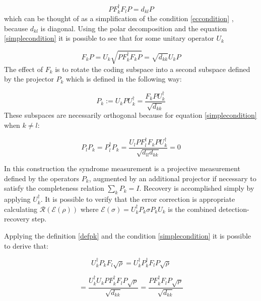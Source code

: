 \documentclass{article}
\begin{document}
\begin{equation}
	\label{simplecondition}
	P F_k^\dagger F_l P = d_{kl}P
\end{equation}
which can be thought of as a simplification of the condition \ref{eccondition} ,
because $d_{kl}$ is diagonal.
Using the polar decomposition and the equation \ref{simplecondition} it is
possible to see that for some unitary operator $U_k$

\begin{equation}
	F_k P = U_k \sqrt{PF_k^\dagger F_k P} = \sqrt{d_{kk}} U_k P
\end{equation}
The effect of $F_k$ is to rotate the coding subspace into a second subspace defined by
the projector $P_k$ which is defined in the following way:

\begin{equation}
	\label{defpk}
	P_k := U_k P U_k^\dagger = \dfrac{F_k P U_k^\dagger}{\sqrt{d_{kk}}}
\end{equation}
These subspaces are necessarily orthogonal because for equation \ref{simplecondition}
when $k \neq l$:

\begin{equation}
	P_l P_k = P_l^\dagger P_k = \dfrac{U_l P F_l^\dagger F_k P U_k^\dagger}{\sqrt{d_{ll}d_{kk}}} = 0
\end{equation}

\noindent In this construction the syndrome measurement is a projective measurement defined by
the operators $P_k$, augmented by an additional projector if necessary to satisfy
the completeness relation $\sum_k P_k = I$.
Recovery is accomplished simply by applying $U_k^\dagger$.
It is possible to verify that the error correction is appropriate calculating
$ \mathcal{R}(\mathcal{E}(\rho)) $ where $\mathcal{E}(\sigma) = U_k^\dagger P_k \sigma P_k U_k$
is the combined detection-recovery step.

\noindent Applying the definition \ref{defpk} and the condition \ref{simplecondition}
it is possible to derive that:

\begin{equation}
	U_k^\dagger P_k F_l \sqrt{\rho} = U_k^\dagger P_k^\dagger F_l P \sqrt{\rho}
\end{equation}

\begin{equation}
	=	\dfrac{U_k^\dagger U_k P F_k^\dagger F_l P \sqrt{\rho}}{\sqrt{d_{kk}}} = \dfrac{P F_k^\dagger F_l P \sqrt{\rho}}{\sqrt{d_{kk}}}
\end{equation}
\end{document}
